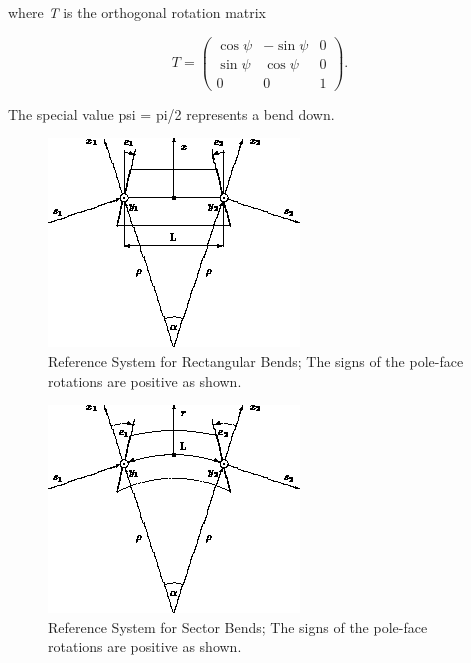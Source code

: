  where \textit{T} is the orthogonal rotation matrix 


\[
T =
 \begin{pmatrix}
  \cos \psi &  -\sin \psi & 0 \\
  \sin \psi &  \cos \psi & 0 \\
	0			&	0			 & 1 
 \end{pmatrix}
.
\]

 The special value psi = pi/2 represents a bend down.  
\begin{figure}[H]
  \centering
	\includegraphics{figures/ref_rbend.png}
  \caption{Reference System for Rectangular Bends; The signs of the pole-face rotations are positive as shown.}
\end{figure}

\begin{figure}[H]
  \centering
	\includegraphics{figures/ref_sbend.png}
  \caption{Reference System for Sector Bends; The signs of the pole-face rotations are positive as shown. }
\end{figure}


